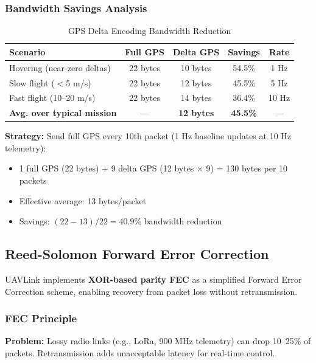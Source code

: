 \documentclass[11pt,a4paper]{article}
\begin{document}
\subsubsection{Bandwidth Savings Analysis}

\begin{table}[H]
\centering
\caption{GPS Delta Encoding Bandwidth Reduction}
\begin{tabular}{@{}lcccc@{}}
\toprule
\textbf{Scenario} & \textbf{Full GPS} & \textbf{Delta GPS} & \textbf{Savings} & \textbf{Rate} \\
\midrule
Hovering (near-zero deltas)  & 22 bytes & 10 bytes & 54.5\% & 1 Hz \\
Slow flight ($<$5 m/s)       & 22 bytes & 12 bytes & 45.5\% & 5 Hz \\
Fast flight (10--20 m/s)     & 22 bytes & 14 bytes & 36.4\% & 10 Hz \\
\midrule
\textbf{Avg. over typical mission} & --- & \textbf{12 bytes} & \textbf{45.5\%} & --- \\
\bottomrule
\end{tabular}
\end{table}

\textbf{Strategy:} Send full GPS every 10th packet (1 Hz baseline updates at 10 Hz telemetry):
\begin{itemize}[noitemsep]
    \item 1 full GPS (22 bytes) + 9 delta GPS (12 bytes $\times$ 9) = 130 bytes per 10 packets
    \item Effective average: 13 bytes/packet
    \item Savings: $(22 - 13) / 22 = 40.9\%$ bandwidth reduction
\end{itemize}

\subsection{Reed-Solomon Forward Error Correction}

UAVLink implements \textbf{XOR-based parity FEC} as a simplified Forward Error Correction scheme, enabling recovery from packet loss without retransmission.

\subsubsection{FEC Principle}

\textbf{Problem:} Lossy radio links (e.g., LoRa, 900 MHz telemetry) can drop 10--25\% of packets. Retransmission adds unacceptable latency for real-time control.
\end{document}
